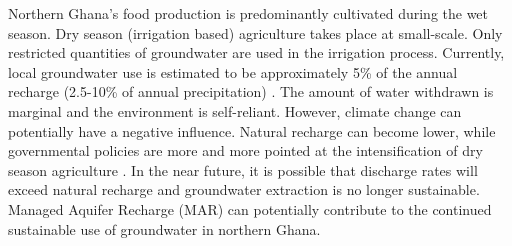 Northern Ghana's food production is predominantly cultivated during the wet season. Dry season (irrigation based) agriculture takes place at small-scale. Only restricted quantities of groundwater are used in the irrigation process. Currently,  local groundwater use is estimated to be approximately 5\% of the annual recharge (2.5-10\% of annual precipitation) \citep{Martin2008}. The amount of water withdrawn is marginal and the environment is self-reliant. However, climate change can potentially have a negative influence. Natural recharge can become lower, while governmental policies are more and more pointed at the intensification of dry season agriculture \citep{Wood2013}. In the near future, it is possible that discharge rates will exceed natural recharge and groundwater extraction is no longer sustainable. Managed Aquifer Recharge (MAR) can potentially contribute to the continued sustainable use of groundwater in northern Ghana. \\ 


%
%
%
%
%

